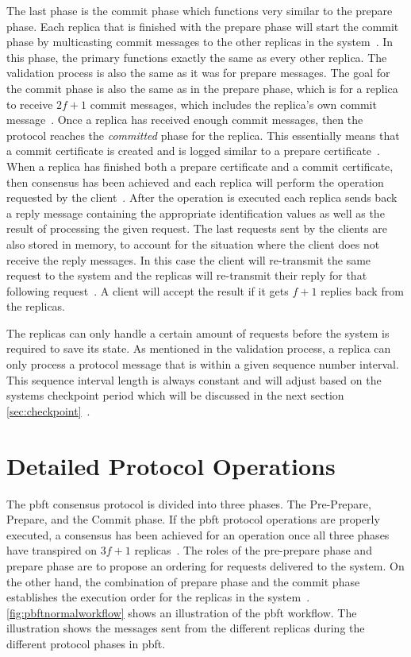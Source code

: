 The last phase is the commit phase which functions very similar to the prepare phase. Each replica that is finished with the prepare phase will start the commit phase by multicasting commit messages to the other replicas in the system~\cite[p.~4]{PAPER:OGPBFT}. In this phase, the primary functions exactly the same as every other replica. The validation process is also the same as it was for prepare messages. The goal for the commit phase is also the same as in the prepare phase, which is for a replica to receive $2f+1$ commit messages, which includes the replica's own commit message~\cite[p.~5]{PAPER:OGPBFT}. Once a replica has received enough commit messages, then the protocol reaches the \emph{committed} phase for the replica. This essentially means that a commit certificate is created and is logged similar to a prepare certificate~\cites[p.~409]{PAPER:PBFTRecovery}[p.~457]{BOOK:MVstandver3}. When a replica has finished both a prepare certificate and a commit certificate, then consensus has been achieved and each replica will perform the operation requested by the client~\cites[p.~409]{PAPER:PBFTRecovery}[p.~5]{PAPER:OGPBFT}. After the operation is executed each replica sends back a reply message containing the appropriate identification values as well as the result of processing the given request. The last requests sent by the clients are also stored in memory, to account for the situation where the client does not receive the reply messages. In this case the client will re-transmit the same request to the system and the replicas will re-transmit their reply for that following request~\cite[p.~409]{PAPER:PBFTRecovery}. A client will accept the result if it gets $f+1$ replies back from the replicas.
 

The replicas can only handle a certain amount of requests before the system is required to save its state. As mentioned in the validation process, a replica can only process a protocol message that is within a given sequence number interval. This sequence interval length is always constant and will adjust based on the systems checkpoint period which will be discussed in the next section \autoref{sec:checkpoint}~\cites[p.~262]{BOOK:BuildDepDistSyst}[p.~4-5]{PAPER:OGPBFT}.
\fi

\section{Detailed Protocol Operations}
\label{sec:detailedProtocol}
The \ac{pbft} consensus protocol is divided into three phases. The Pre-Prepare, Prepare, and the Commit phase. If the \ac{pbft} protocol operations are properly executed, a consensus has been achieved for an operation once all three phases have transpired on $3f+1$ replicas~\cite[p.~257-259]{BOOK:BuildDepDistSyst}. The roles of the pre-prepare phase and prepare phase are to propose an ordering for requests delivered to the system. On the other hand, the combination of prepare phase and the commit phase establishes the execution order for the replicas in the system~\cite[p.~4]{PAPER:OGPBFT}. \autoref{fig:pbftnormalworkflow} shows an illustration of the \ac{pbft} workflow. The illustration shows the messages sent from the different replicas during the different protocol phases in \ac{pbft}.

